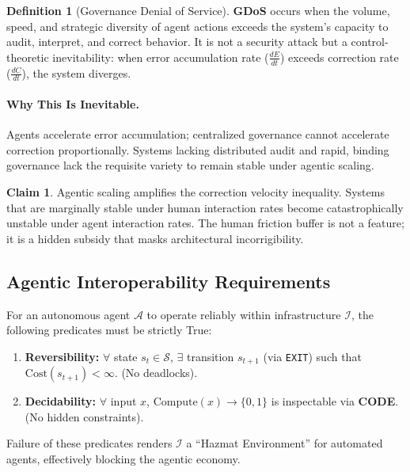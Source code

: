 \documentclass[11pt,a4paper]{article}
\theoremstyle{definition}
\newtheorem{definition}{Definition}[section]
\newtheorem{claim}{Claim}[section]
\begin{document}
\begin{definition}[Governance Denial of Service]
\label{def:gdos}
\textbf{GDoS} occurs when the volume, speed, and strategic diversity of agent actions exceeds the system's capacity to audit, interpret, and correct behavior. It is not a security attack but a control-theoretic inevitability: when error accumulation rate ($\frac{dE}{dt}$) exceeds correction rate ($\frac{dC}{dt}$), the system diverges.
\end{definition}

\paragraph{Why This Is Inevitable.} Agents accelerate error accumulation; centralized governance cannot accelerate correction proportionally. Systems lacking distributed audit and rapid, binding governance lack the requisite variety to remain stable under agentic scaling.

\begin{claim}
Agentic scaling amplifies the correction velocity inequality. Systems that are marginally stable under human interaction rates become catastrophically unstable under agent interaction rates. The human friction buffer is not a feature; it is a hidden subsidy that masks architectural incorrigibility.
\end{claim}

\subsection{Agentic Interoperability Requirements}

For an autonomous agent $\mathcal{A}$ to operate reliably within infrastructure $\mathcal{I}$, the following predicates must be strictly True:

\begin{enumerate}[noitemsep]
    \item \textbf{Reversibility:} $\forall$ state $s_t \in \mathcal{S}$, $\exists$ transition $s_{t+1}$ (via \texttt{EXIT}) such that $\text{Cost}(s_{t+1}) < \infty$. (No deadlocks).
    \item \textbf{Decidability:} $\forall$ input $x$, $\text{Compute}(x) \to \{0,1\}$ is inspectable via \textbf{CODE}. (No hidden constraints).
\end{enumerate}

Failure of these predicates renders $\mathcal{I}$ a ``Hazmat Environment'' for automated agents, effectively blocking the agentic economy.
\end{document}
